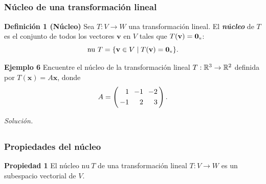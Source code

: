 
\subsection{}

\begin{frame}\frametitle{Núcleo de una transformación lineal}

\begin{block}{\textbf{Definición 1 (Núcleo)}}
	\justifying
	Sea $T:V\to W$ una transformación lineal. El \textbf{\textit{núcleo}} de $T$ es el conjunto de 
	todos los vectores $\mathbf{v}$ en $V$ tales que $T(\mathbf{v}) = \mathbf{0}_{\scalebox{0.4}{W}}$:
	\[
	\text{nu}\ T = \{ \mathbf{v}\in V \mid T(\mathbf{v}) = \mathbf{0}_{\scalebox{0.4}{W}} \}.
	\]
\end{block}


\begin{ej}{\textbf{Ejemplo 6}}
	\justifying
	Encuentre el núcleo de la transformación lineal $T:\mathbb{R}^3\to \mathbb{R}^2$ definida por $T(\mathbf{x})=A\mathbf{x}$,
	donde
	\[
	A = 
	\left(
	\begin{array}{@{\hspace{0.3\tabcolsep}}r@{\hspace{1.2\tabcolsep}}r@{\hspace{1.2\tabcolsep}}r@{\hspace{0.3\tabcolsep}}}
	 1 & -1 & -2 \\[1mm]
	-1 & 2 & 3
	\end{array}
	\right).
	\]
\end{ej}
\textit{Solución.}

\end{frame}


\subsection{}

\begin{frame}\frametitle{Propiedades del núcleo}

\begin{prop}{\textbf{Propiedad 1}}
	\justifying
	El núcleo $\text{nu}\ T$ de una transformación lineal $T:V\to W$ es un subespacio vectorial de $V$.
\end{prop}	

\end{frame}

